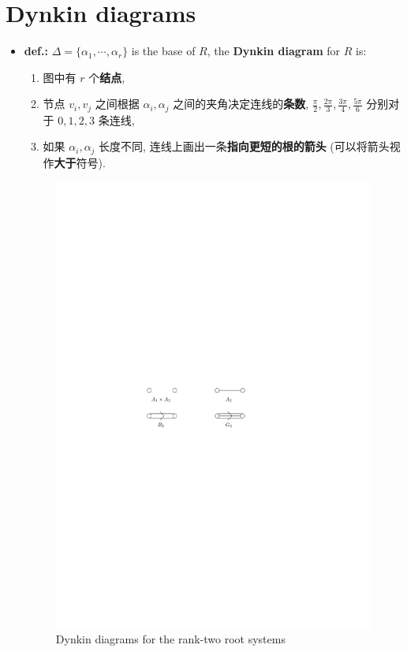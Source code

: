 \section{Dynkin diagrams} \label{7.6}
\begin{itemize}
	\item \textbf{def.:} $\Delta = \{\alpha_1, \cdots, \alpha_r\}$ is the base of $R$, the \textbf{Dynkin diagram} for $R$ is:
	\begin{enumerate}
		\item 图中有 $r$ 个\textbf{结点},
		
		\item 节点 $v_i, v_j$ 之间根据 $\alpha_i, \alpha_j$ 之间的夹角决定连线的\textbf{条数}, $\frac{\pi}{2}, \frac{2 \pi}{3}, \frac{3 \pi}{4}, \frac{5 \pi}{6}$ 分别对于 $0, 1, 2, 3$ 条连线,
		
		\item 如果 $\alpha_i, \alpha_j$ 长度不同, 连线上画出一条\textbf{指向更短的根的箭头} (可以将箭头视作\textbf{大于}符号).
	\end{enumerate}
	
	\begin{figure}[H]
		\centering
		\includegraphics[scale=1]{figures/Dynkin diagrams for the rank-two root systems.pdf}
		\caption{Dynkin diagrams for the rank-two root systems}
	\end{figure}
	

\end{itemize}
